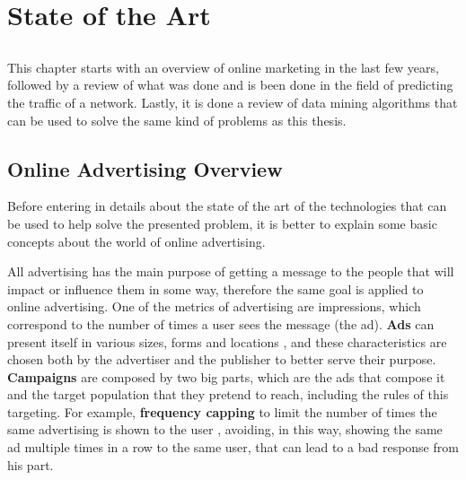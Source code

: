\chapter{State of the Art} \label{chap:sota}

\section*{}

This chapter starts with an overview of online marketing in the last few years, followed by a review of
what was done and is been done in the field of predicting the traffic of a network.
Lastly, it is done a review of data mining algorithms that can be used to solve the same kind of problems as this thesis.

\section{Online Advertising Overview}

Before entering in details about the state of the art of the technologies that can be used to
help solve the presented problem, it is better to explain some basic concepts about the world of online advertising.

All advertising has the main purpose of getting a message to the people that will impact or influence them in some way,
therefore the same goal is applied to online advertising.
One of the metrics of advertising are impressions, which correspond to the number of times a user sees the message (the ad).\cite{kOA}
\textbf{Ads} can present itself in various sizes\cite{kOA2}, forms and locations \cite{kOA3}, and these characteristics are chosen both by the advertiser
and the publisher to better serve their purpose.
\textbf{Campaigns} are composed by two big parts, which are the ads that compose it and the target population that they pretend to reach,
including the rules of this targeting. For example, \textbf{frequency capping} to limit the number of times the same advertising is shown to the user \cite{kOA},
avoiding, in this way, showing the same ad multiple times in a row to the same user, that can lead to a bad response from his part.\cite{Buchbinder20141}

